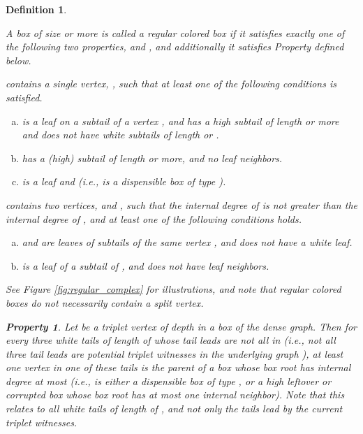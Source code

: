 \documentclass[11pt]{article}
\def\dnsitem{\vspace{-7pt}\item}
\def\dnssubitem{\vspace{-5pt}\item}
\newtheorem{definition}[theorem]{Definition}
\theoremstyle{definition}
\newtheorem*{tpropt1*}{Property }
\begin{document}
\begin{definition}
\label{def:regular_colored}

A box  of size  or more is called a \emph{regular colored} box if it satisfies exactly one of the following two properties,  and , and additionally it satisfies Property  defined below.

\begin{description}
	\dnsitem[.]  contains a single  vertex, , such that at least one of the following conditions is satisfied. 
	\begin{enumerate}[(a)]
		\dnsitem \label{invnp:1leaf}
		 is a leaf on a subtail of a vertex , and  has a high subtail of length  or more and does not have white subtails of length  or . 
		\dnssubitem \label{invnp:1tail}
		 has a (high) subtail of length  or more, and no leaf neighbors. 
		\dnssubitem \label{invnp:d1}
		 is a leaf and  (i.e.,  is a dispensible box of type ).
	\end{enumerate}

	\dnsitem[.]  contains two  vertices,  and , 
	such that the internal degree of  is not greater than the internal degree of ,
	and at least one of the following conditions holds. 
	\begin{enumerate}[(a)]
		\dnsitem \label{invnp:2leaves}
		 and  are leaves of subtails of the same vertex , and  does not have a white leaf.
		\dnssubitem \label{invnp:2tail}
		 is a leaf of a subtail of , and  does not have leaf neighbors.
	\end{enumerate}
\end{description}

See Figure \ref{fig:regular_complex} for illustrations, and note that regular colored boxes do not necessarily contain a split vertex. 

\begin{tpropt1*}
Let  be a triplet vertex of depth  in a box  of the dense graph. 
Then for every three white tails of length  of  whose tail leads 
are not all in  (i.e., not all three tail leads are potential triplet witnesses in the underlying graph ), 
at least one vertex  in one of these tails is the parent of a box  whose box root has internal degree at most 
(i.e.,  is either a dispensible box of type , or a high leftover or corrupted box whose box root has at most one internal neighbor).
Note that this relates to all white tails of length  of , and not only the tails lead by the current triplet witnesses.
\end{tpropt1*}
\end{definition}
\end{document}
